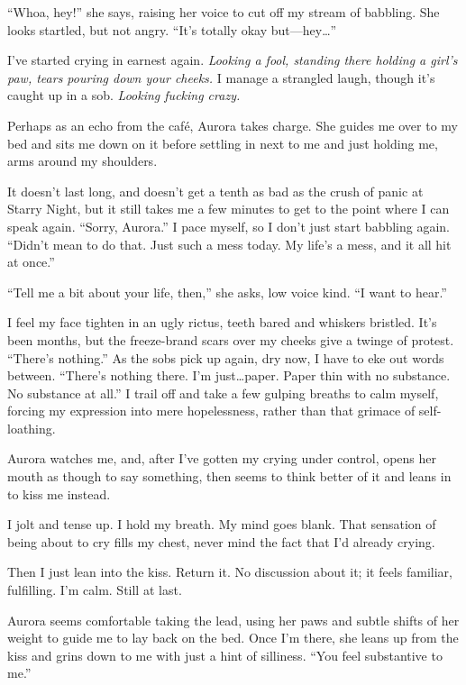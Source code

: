``Whoa, hey!'' she says, raising her voice to cut off my stream of babbling. She looks startled, but not angry. ``It's totally okay but---hey\ldots{}''

I've started crying in earnest again. \emph{Looking a fool, standing there holding a girl's paw, tears pouring down your cheeks.} I manage a strangled laugh, though it's caught up in a sob. \emph{Looking fucking crazy.}

Perhaps as an echo from the café, Aurora takes charge. She guides me over to my bed and sits me down on it before settling in next to me and just holding me, arms around my shoulders.

It doesn't last long, and doesn't get a tenth as bad as the crush of panic at Starry Night, but it still takes me a few minutes to get to the point where I can speak again. ``Sorry, Aurora.'' I pace myself, so I don't just start babbling again. ``Didn't mean to do that. Just such a mess today. My life's a mess, and it all hit at once.''

``Tell me a bit about your life, then,'' she asks, low voice kind. ``I want to hear.''

I feel my face tighten in an ugly rictus, teeth bared and whiskers bristled. It's been months, but the freeze-brand scars over my cheeks give a twinge of protest. ``There's nothing.'' As the sobs pick up again, dry now, I have to eke out words between. ``There's nothing there. I'm just\ldots{}paper. Paper thin with no substance. No substance at all.'' I trail off and take a few gulping breaths to calm myself, forcing my expression into mere hopelessness, rather than that grimace of self-loathing.

Aurora watches me, and, after I've gotten my crying under control, opens her mouth as though to say something, then seems to think better of it and leans in to kiss me instead.

I jolt and tense up. I hold my breath. My mind goes blank. That sensation of being about to cry fills my chest, never mind the fact that I'd already crying.

Then I just lean into the kiss. Return it. No discussion about it; it feels familiar, fulfilling. I'm calm. Still at last.

Aurora seems comfortable taking the lead, using her paws and subtle shifts of her weight to guide me to lay back on the bed. Once I'm there, she leans up from the kiss and grins down to me with just a hint of silliness. ``You feel substantive to me.''

